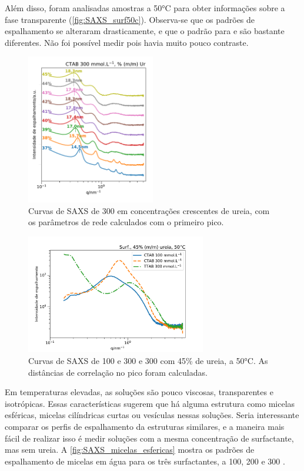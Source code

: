 	Além disso, foram analisadas amostras a 50°C para obter informações sobre a fase transparente (\autoref{fig:SAXS_surf50c}). Observa-se que os padrões de espalhamento se alteraram drasticamente, e que o padrão para \CTAB{} e \TTAB{} são bastante diferentes. Não foi possível medir \DTAB{} pois havia muito pouco contraste.
	
	\begin{figure}[h]
		\centering
		\includegraphics[width=0.5\textwidth]{imagens/saxs/CTAB300Ur37-45}
		\caption{Curvas de SAXS de \CTAB{} 300 \mM{} em concentrações crescentes de ureia, com os parâmetros de rede calculados com o primeiro pico.}
		\label{fig:SAXS_ctab300ur37-45}
	\end{figure}
	
	\begin{figure}[h]
		\centering
		\includegraphics[width=0.7\textwidth]{imagens/saxs/Surf_50C}
		\caption{Curvas de SAXS de \CTAB{} 100 e 300 \mM{} e \TTAB{} 300 \mM{} com 45\% de ureia, a 50°C. As distâncias de correlação no pico foram calculadas.}
		\label{fig:SAXS_surf50c}
	\end{figure}

	Em temperaturas elevadas, as soluções são pouco viscosas, transparentes e isotrópicas. Essas características sugerem que há alguma estrutura como micelas esféricas, micelas cilíndricas curtas ou vesículas nessas soluções. Seria interessante comparar os perfis de espalhamento da estruturas similares, e a maneira mais fácil de realizar isso é medir soluções com a mesma concentração de surfactante, mas sem ureia. A \autoref{fig:SAXS_micelas_esfericas} mostra os padrões de espalhamento de micelas em água para os três surfactantes, a 100, 200 e 300 \mM.
	
